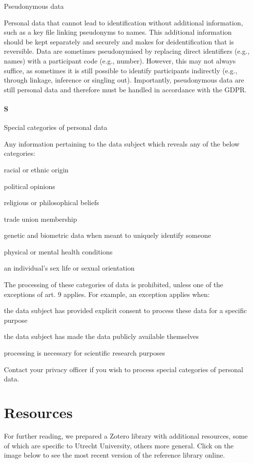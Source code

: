 \documentclass[
]{book}
\begin{document}
Pseudonymous data

Personal data that cannot lead to identification without additional information,
such as a key file linking pseudonyms to names. This additional information should be kept separately and securely
and makes for deidentification that is reversible. Data are sometimes pseudonymised by replacing direct identifiers
(e.g., names) with a participant code (e.g., number). However, this may not always suffice, as sometimes it is still
possible to identify participants indirectly (e.g., through linkage, inference or singling out). Importantly, pseudonymous
data are still personal data and therefore must be handled in accordance with the GDPR.

\hypertarget{s}{%
\subsubsection{S}\label{s}}

Special categories of personal data

Any information pertaining to the data subject which reveals any of the below categories:

racial or ethnic origin

political opinions

religious or philosophical beliefs

trade union membership

genetic and biometric data when meant to uniquely identify someone

physical or mental health conditions

an individual's sex life or sexual orientation

The processing of these categories of data is
prohibited, unless one of the exceptions of
art. 9 applies.
For example, an exception applies when:

the data subject has provided explicit consent to process these data for a specific purpose

the data subject has made the data publicly available themselves

processing is necessary for scientific research purposes

Contact your privacy officer if you wish to process special categories of personal data.

\hypertarget{references}{%
\chapter{Resources}\label{references}}

For further reading, we prepared a Zotero library with additional resources, some
of which are specific to Utrecht University, others more general. Click on the
image below to see the most recent version of the reference library online.

  
\end{document}
